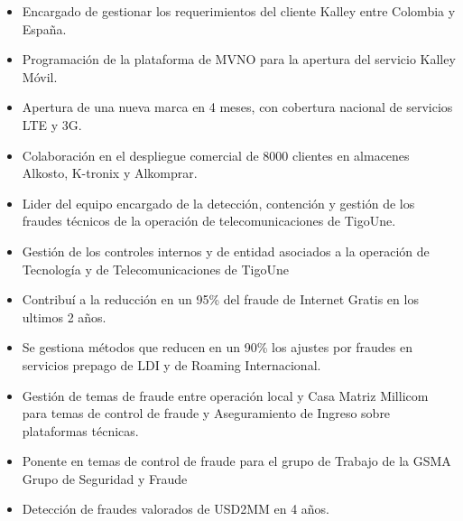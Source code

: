 \documentclass[10pt,letter]{altacv}
\begin{document}

\begin{fullwidth}
\makecvheader
\end{fullwidth}

\begin{itemize}
\item Encargado de gestionar los requerimientos del cliente Kalley entre Colombia y España.
\item Programación de la plataforma de MVNO para la apertura del servicio Kalley Móvil.
\item Apertura de una nueva marca en 4 meses, con cobertura nacional de servicios LTE y 3G.
\item Colaboración en el despliegue comercial de 8000 clientes en almacenes Alkosto, K-tronix y Alkomprar.
\end{itemize}
\begin{itemize}
\item Lider del equipo encargado de la detección, contención y gestión de los fraudes técnicos de la operación de telecomunicaciones de TigoUne.
\item Gestión de los controles internos y de entidad asociados a la operación de Tecnología y de Telecomunicaciones de TigoUne
\item Contribuí a la reducción en un 95\% del fraude de Internet Gratis en los ultimos 2 años.
\item Se gestiona métodos que reducen en un 90\% los ajustes por fraudes en servicios prepago de LDI y de Roaming Internacional.
\item Gestión de temas de fraude entre operación local y Casa Matriz Millicom para temas de control de fraude y Aseguramiento de Ingreso sobre plataformas técnicas.
\item Ponente en temas de control de fraude para el grupo de Trabajo de la GSMA Grupo de Seguridad y Fraude
\item Detección de fraudes valorados de USD2MM en 4 años.
\end{itemize}
\end{document}
